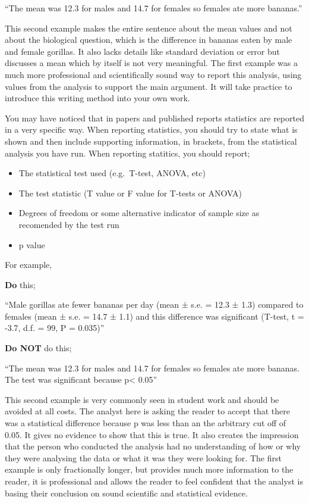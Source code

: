 \documentclass[
]{book}
\providecommand{\tightlist}{%
  \setlength{\itemsep}{0pt}\setlength{\parskip}{0pt}}
\begin{document}
``The mean was 12.3 for males and 14.7 for females so females ate more bananas.''

This second example makes the entire sentence about the mean values and not about the biological question, which is the difference in bananas eaten by male and female gorillas. It also lacks details like standard deviation or error but discusses a mean which by itself is not very meaningful. The first example was a much more professional and scientifically sound way to report this analysis, using values from the analysis to support the main argument. It will take practice to introduce this writing method into your own work.

You may have noticed that in papers and published reports statistics are reported in a very specific way. When reporting statistics, you should try to state what is shown and then include supporting information, in brackets, from the statistical analysis you have run. When reporting statitics, you should report;

\begin{itemize}
\tightlist
\item
  The statistical test used (e.g.~T-test, ANOVA, etc)
\item
  The test statistic (T value or F value for T-tests or ANOVA)
\item
  Degrees of freedom or some alternative indicator of sample size as recomended by the test run
\item
  p value
\end{itemize}

For example,

\textbf{Do} this;

``Male gorillas ate fewer bananas per day (mean ± s.e. = 12.3 ± 1.3) compared to females (mean ± s.e. = 14.7 ± 1.1) and this difference was significant (T-test, t = -3.7, d.f. = 99, P = 0.035)''

\textbf{Do NOT} do this;

``The mean was 12.3 for males and 14.7 for females so females ate more bananas. The test was significant because p\textless{} 0.05''

This second example is very commonly seen in student work and should be avoided at all costs. The analyst here is asking the reader to accept that there was a statistical difference because p was less than an the arbitrary cut off of 0.05. It gives no evidence to show that this is true. It also creates the impression that the person who conducted the analysis had no understanding of how or why they were analysing the data or what it was they were looking for. The first example is only fractionally longer, but provides much more information to the reader, it is professional and allows the reader to feel confident that the analyst is basing their conclusion on sound scientific and statistical evidence.
\end{document}
